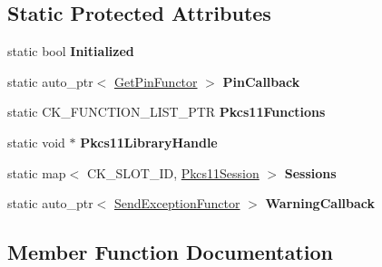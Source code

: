 \subsection*{Static Protected Attributes}
\begin{DoxyCompactItemize}
\item 
\mbox{\label{class_gost_crypt_1_1_security_token_a7470559b6841a63985e8b3e0c9831be1}} 
static bool {\bfseries Initialized}
\item 
\mbox{\label{class_gost_crypt_1_1_security_token_a4482ae2fcd832a84d63f46a615b97329}} 
static auto\+\_\+ptr$<$ \hyperlink{struct_gost_crypt_1_1_get_pin_functor}{Get\+Pin\+Functor} $>$ {\bfseries Pin\+Callback}
\item 
\mbox{\label{class_gost_crypt_1_1_security_token_a8e348c4ac04afcc9cfae4052006dbb66}} 
static C\+K\+\_\+\+F\+U\+N\+C\+T\+I\+O\+N\+\_\+\+L\+I\+S\+T\+\_\+\+P\+TR {\bfseries Pkcs11\+Functions}
\item 
\mbox{\label{class_gost_crypt_1_1_security_token_a80df030aafa3c53a75fb37deb74037aa}} 
static void $\ast$ {\bfseries Pkcs11\+Library\+Handle}
\item 
\mbox{\label{class_gost_crypt_1_1_security_token_af62865d84049d668e759d82945743b3e}} 
static map$<$ C\+K\+\_\+\+S\+L\+O\+T\+\_\+\+ID, \hyperlink{struct_gost_crypt_1_1_pkcs11_session}{Pkcs11\+Session} $>$ {\bfseries Sessions}
\item 
\mbox{\label{class_gost_crypt_1_1_security_token_a889f74bf24b9e92394a3f11597e6b4d7}} 
static auto\+\_\+ptr$<$ \hyperlink{struct_gost_crypt_1_1_send_exception_functor}{Send\+Exception\+Functor} $>$ {\bfseries Warning\+Callback}
\end{DoxyCompactItemize}


\subsection{Member Function Documentation}
\mbox{\label{class_gost_crypt_1_1_security_token_aacb372a5fbd24dfc169ca855bf19230c}} 
